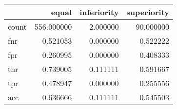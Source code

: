 \begin{tabular}{lrrr}
\toprule
{} &       equal &  inferiority &  superiority \\
\midrule
count &  556.000000 &     2.000000 &    90.000000 \\
fnr   &    0.521053 &     0.000000 &     0.522222 \\
fpr   &    0.260995 &     0.000000 &     0.408333 \\
tnr   &    0.739005 &     0.111111 &     0.591667 \\
tpr   &    0.478947 &     0.000000 &     0.255556 \\
acc   &    0.636666 &     0.111111 &     0.545503 \\
\bottomrule
\end{tabular}
